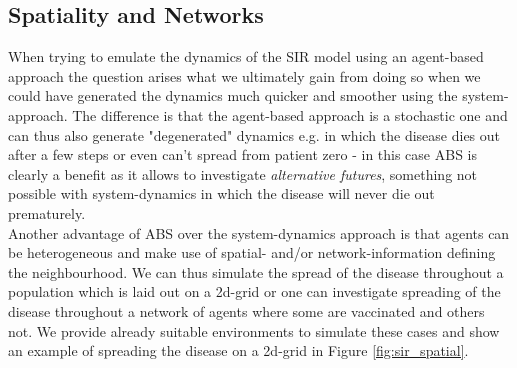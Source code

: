 \subsection{Spatiality and Networks}
When trying to emulate the dynamics of the SIR model using an agent-based approach the question arises what we ultimately gain from doing so when we could have generated the dynamics much quicker and smoother using the system-approach. The difference is that the agent-based approach is a stochastic one and can thus also generate "degenerated" dynamics e.g. in which the disease dies out after a few steps or even can't spread from patient zero - in this case ABS is clearly a benefit as it allows to investigate \textit{alternative futures}, something not possible with system-dynamics in which the disease will never die out prematurely. \\
Another advantage of ABS over the system-dynamics approach is that agents can be heterogeneous and make use of spatial- and/or network-information defining the neighbourhood. We can thus simulate the spread of the disease throughout a population which is laid out on a 2d-grid or one can investigate spreading of the disease throughout a network of agents where some are vaccinated and others not. We provide already suitable environments to simulate these cases and show an example of spreading the disease on a 2d-grid in Figure \ref{fig:sir_spatial}.  

